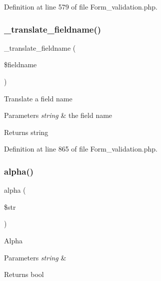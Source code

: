 Definition at line 579 of file Form\+\_\+validation.\+php.

\mbox{\label{class_c_i___form__validation_ae6b1edc93754376c05622d905845c215}} 
\subsubsection{\texorpdfstring{\_translate\_fieldname()}{\_translate\_fieldname()}}
{\footnotesize\ttfamily \+\_\+translate\+\_\+fieldname (\begin{DoxyParamCaption}\item[{}]{\$fieldname }\end{DoxyParamCaption})\hspace{0.3cm}{\ttfamily [protected]}}

Translate a field name


\begin{DoxyParams}{Parameters}
{\em string} & the field name \\
\hline
\end{DoxyParams}
\begin{DoxyReturn}{Returns}
string 
\end{DoxyReturn}


Definition at line 865 of file Form\+\_\+validation.\+php.

\mbox{\label{class_c_i___form__validation_a4784b18b432005bec36cdf437353ec76}} 
\subsubsection{\texorpdfstring{alpha()}{alpha()}}
{\footnotesize\ttfamily alpha (\begin{DoxyParamCaption}\item[{}]{\$str }\end{DoxyParamCaption})}

Alpha


\begin{DoxyParams}{Parameters}
{\em string} & \\
\hline
\end{DoxyParams}
\begin{DoxyReturn}{Returns}
bool 
\end{DoxyReturn}


